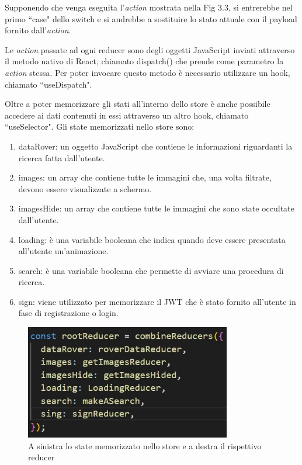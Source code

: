 Supponendo che venga eseguita l'\textit{action} mostrata nella Fig 3.3, si entrerebbe nel primo ``case" dello switch e si andrebbe a sostituire lo stato attuale con il payload fornito dall'\textit{action}.

Le \textit{action} passate ad ogni reducer sono degli oggetti JavaScript inviati attraverso il metodo nativo di React, chiamato dispatch() che prende come parametro la \textit{action} stessa. Per poter invocare questo metodo 
\`e necessario utilizzare un hook, chiamato ``useDispatch".

Oltre a poter memorizzare gli stati all'interno dello store \`e anche possibile accedere ai dati contenuti in essi attraverso un altro hook, chiamato ``useSelector".
Gli state memorizzati nello store sono:
\begin{enumerate}
    \item dataRover: un oggetto JavaScript che contiene le informazioni riguardanti la ricerca fatta dall'utente.
    \item images: un array che contiene tutte le immagini che, una volta filtrate, devono essere visualizzate a schermo.
    \item imagesHide: un array che contiene tutte le immagini che sono state occultate dall'utente.
    \item loading: \`e una variabile booleana che indica quando deve essere presentata all'utente un'animazione.
    \item search: \`e una variabile booleana che permette di avviare una procedura di ricerca.
    \item sign: viene utilizzato per memorizzare il JWT che \`e stato fornito all'utente in fase di registrazione o login.
\end{enumerate}
\begin{figure}[h]
    \centering
    \includegraphics[width=9cm, height=5cm]{images/state.jpg}
    \caption[differenzeiteot]{A sinistra lo state memorizzato nello store e a destra il rispettivo reducer}
    \label{fig:state}
\end{figure}
